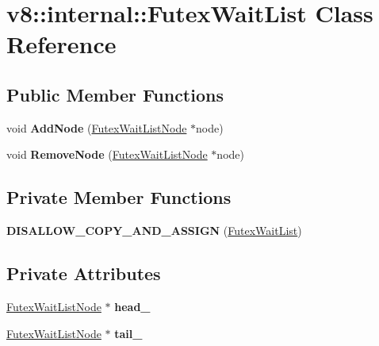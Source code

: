 \hypertarget{classv8_1_1internal_1_1_futex_wait_list}{}\section{v8\+:\+:internal\+:\+:Futex\+Wait\+List Class Reference}
\label{classv8_1_1internal_1_1_futex_wait_list}
\subsection*{Public Member Functions}
\begin{DoxyCompactItemize}
\item 
void {\bfseries Add\+Node} (\hyperlink{classv8_1_1internal_1_1_futex_wait_list_node}{Futex\+Wait\+List\+Node} $\ast$node)\hypertarget{classv8_1_1internal_1_1_futex_wait_list_a0f8a0f9c4de08fe17ad6211e97800a34}{}\label{classv8_1_1internal_1_1_futex_wait_list_a0f8a0f9c4de08fe17ad6211e97800a34}

\item 
void {\bfseries Remove\+Node} (\hyperlink{classv8_1_1internal_1_1_futex_wait_list_node}{Futex\+Wait\+List\+Node} $\ast$node)\hypertarget{classv8_1_1internal_1_1_futex_wait_list_a7aae049debaca1319024523380a995f9}{}\label{classv8_1_1internal_1_1_futex_wait_list_a7aae049debaca1319024523380a995f9}

\end{DoxyCompactItemize}
\subsection*{Private Member Functions}
\begin{DoxyCompactItemize}
\item 
{\bfseries D\+I\+S\+A\+L\+L\+O\+W\+\_\+\+C\+O\+P\+Y\+\_\+\+A\+N\+D\+\_\+\+A\+S\+S\+I\+GN} (\hyperlink{classv8_1_1internal_1_1_futex_wait_list}{Futex\+Wait\+List})\hypertarget{classv8_1_1internal_1_1_futex_wait_list_abee2d53581e9eded3f6cbb98678ac654}{}\label{classv8_1_1internal_1_1_futex_wait_list_abee2d53581e9eded3f6cbb98678ac654}

\end{DoxyCompactItemize}
\subsection*{Private Attributes}
\begin{DoxyCompactItemize}
\item 
\hyperlink{classv8_1_1internal_1_1_futex_wait_list_node}{Futex\+Wait\+List\+Node} $\ast$ {\bfseries head\+\_\+}\hypertarget{classv8_1_1internal_1_1_futex_wait_list_a0320ac96787b014ba77fa4d115a67198}{}\label{classv8_1_1internal_1_1_futex_wait_list_a0320ac96787b014ba77fa4d115a67198}

\item 
\hyperlink{classv8_1_1internal_1_1_futex_wait_list_node}{Futex\+Wait\+List\+Node} $\ast$ {\bfseries tail\+\_\+}\hypertarget{classv8_1_1internal_1_1_futex_wait_list_afb27c4d9b1402c5201b5dd60eb57b63f}{}\label{classv8_1_1internal_1_1_futex_wait_list_afb27c4d9b1402c5201b5dd60eb57b63f}

\end{DoxyCompactItemize}
